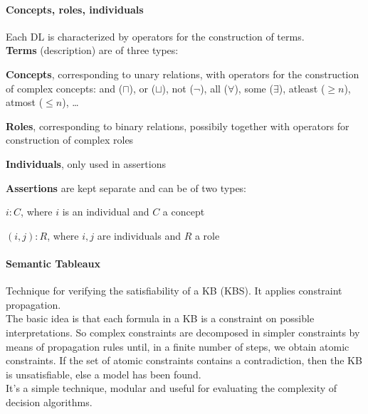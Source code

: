 \documentclass[10pt]{report}
\begin{document}
\paragraph{Concepts, roles, individuals} Each DL is characterized by operators for the construction of terms.\\
\textbf{Terms} (description) are of three types:
\begin{list}{}{}
	\item \textbf{Concepts}, corresponding to unary relations, with operators for the construction of complex concepts: and ($\sqcap$), or ($\sqcup$), not ($\neg$), all ($\forall$), some ($\exists$), atleast ($\geq n$), atmost ($\leq n$), \ldots
	\item \textbf{Roles}, corresponding to binary relations, possibily together with operators for construction of complex roles
	\item \textbf{Individuals}, only used in assertions
\end{list}
\textbf{Assertions} are kept separate and can be of two types:
\begin{list}{}{}
	\item $i:C$, where $i$ is an individual and $C$ a concept
	\item $(i,j):R$, where $i,j$ are individuals and $R$ a role
\end{list}
\paragraph{Semantic Tableaux} Technique for verifying the satisfiability of a KB (KBS). It applies constraint propagation.\\
The basic idea is that each formula in a KB is a constraint on possible interpretations. So complex constraints are decomposed in simpler constraints by means of propagation rules until, in a finite number of steps, we obtain atomic constraints. If the set of atomic constraints contains a contradiction, then the KB is unsatisfiable, else a model has been found.\\
It's a simple technique, modular and useful for evaluating the complexity of decision algorithms.
\end{document}
